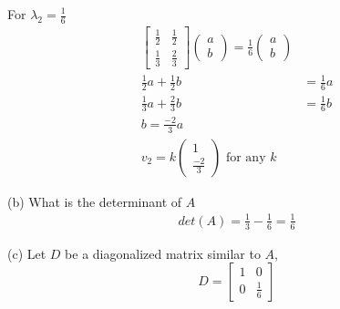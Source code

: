 \documentclass[a4paper, 10pt]{article}
\begin{document}
For $\lambda_2 = \frac{1}{6}$ 
\begin{align*}
   \begin{bmatrix} 
      \frac{1}{2} & \frac{1}{2} \\
      \frac{1}{3} & \frac{2}{3} 
   \end{bmatrix} \begin{pmatrix} a \\b  \end{pmatrix}  = \frac{1}{6} \begin{pmatrix} a \\b \end{pmatrix}  \\ 
      \frac{1}{2} a + \frac{1}{2} b &= \frac{1}{6}a \\
      \frac{1}{3} a + \frac{2}{3} b &= \frac{1}{6} b \\
      b = \frac{-2}{3} a\\
      v_2 = k \begin{pmatrix} 1 \\ \frac{-2}{3} \end{pmatrix} \text{ for any $k$}
\end{align*}

(b) What is the determinant of $A$ \\

\begin{align*}
   det(A) = \frac{1}{3} - \frac{1}{6} = \frac{1}{6}
\end{align*}

(c) Let $D$ be a diagonalized matrix similar to $A$,
 \[
    D = \begin{bmatrix} 
       1 & 0 \\
       0 & \frac{1}{6}
    \end{bmatrix}
 \] 
\end{document}
